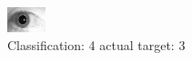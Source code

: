 \begin{figure}[h!]
\begin{center}
\includegraphics[width=0.60\columnwidth]{figures/ID1858_class_4_target_3.png}
\end{center}
\caption{ Classification: 4 actual target: 3}
\label{fig:ID1858_class_4_target_3}
\end{figure}
